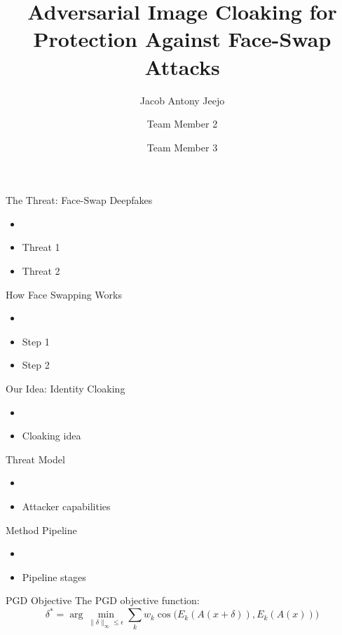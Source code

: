 \documentclass[aspectratio=169]{beamer}
\title{Adversarial Image Cloaking for Protection Against Face-Swap Attacks}
\author{Jacob Antony Jeejo \and Team Member 2 \and Team Member 3}
\institute{Indian Institute of Information Technology Kottayam}
\date{}
\begin{document}
\begin{frame}
    \titlepage
\end{frame}

\begin{frame}{The Threat: Face-Swap Deepfakes}
    \begin{itemize}
        \item %
        \item Threat 1
        \item Threat 2
    \end{itemize}
\end{frame}

\begin{frame}{How Face Swapping Works}
    \begin{itemize}
        \item %
        \item Step 1
        \item Step 2
    \end{itemize}
\end{frame}

\begin{frame}{Our Idea: Identity Cloaking}
    \begin{itemize}
        \item %
        \item Cloaking idea
    \end{itemize}
\end{frame}

\begin{frame}{Threat Model}
    \begin{itemize}
        \item %
        \item Attacker capabilities
    \end{itemize}
\end{frame}

\begin{frame}{Method Pipeline}
    \begin{itemize}
        \item %
        \item Pipeline stages
    \end{itemize}
\end{frame}

\begin{frame}{PGD Objective}
    The PGD objective function:
    \begin{equation}
    \delta^* = \arg\min_{\|\delta\|_\infty \le \epsilon} \sum_k w_k \cos\big(E_k(A(x+\delta)), E_k(A(x))\big)
    \end{equation}
\end{frame}
\end{document}
